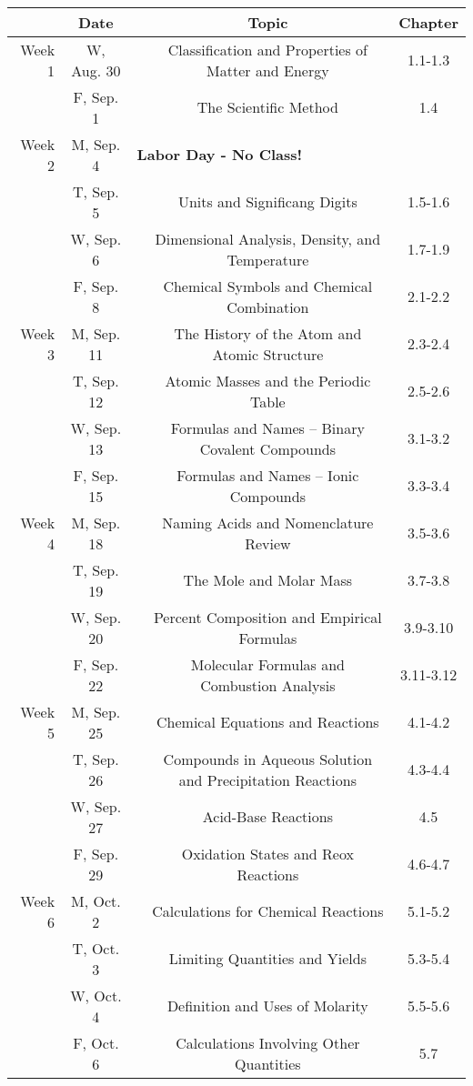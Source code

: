 \documentclass[12pt, letterpaper]{article}
\begin{document}
~

\noindent
\begin{tabular}{rcccc}
	& Date && Topic & Chapter\\
	\midrule
	Week 1 & W, Aug. 30&& Classification and Properties of Matter and Energy & 1.1-1.3\\
	& F, Sep. 1&& The Scientific Method & 1.4\\
	\midrule
	Week 2 & M, Sep. 4& \multicolumn{3}{l}{\textbf{Labor Day - No Class!}}\\
	& T, Sep. 5&& Units and Significang Digits & 1.5-1.6\\
	& W, Sep. 6&& Dimensional Analysis, Density, and Temperature & 1.7-1.9\\
	& F, Sep. 8&& Chemical Symbols and Chemical Combination & 2.1-2.2\\
	\midrule
	Week 3 & M, Sep. 11&& The History of the Atom and Atomic Structure & 2.3-2.4\\
	& T, Sep. 12&& Atomic Masses and the Periodic Table & 2.5-2.6\\
	& W, Sep. 13&& Formulas and Names -- Binary Covalent Compounds & 3.1-3.2\\
	& F, Sep. 15&& Formulas and Names -- Ionic Compounds & 3.3-3.4\\
	\midrule
	Week 4 & M, Sep. 18&& Naming Acids and Nomenclature Review & 3.5-3.6\\
	& T, Sep. 19&& The Mole and Molar Mass & 3.7-3.8\\
	& W, Sep. 20&& Percent Composition and Empirical Formulas & 3.9-3.10\\
	& F, Sep. 22&& Molecular Formulas and Combustion Analysis & 3.11-3.12\\
	\midrule
	Week 5 & M, Sep. 25&& Chemical Equations and Reactions & 4.1-4.2\\
	& T, Sep. 26&& Compounds in Aqueous Solution and Precipitation Reactions & 4.3-4.4\\
	& W, Sep. 27&& Acid-Base Reactions & 4.5\\
	& F, Sep. 29&& Oxidation States and Reox Reactions & 4.6-4.7\\
	\midrule
	Week 6 & M, Oct. 2&& Calculations for Chemical Reactions & 5.1-5.2\\
	& T, Oct. 3&& Limiting Quantities and Yields & 5.3-5.4\\
	& W, Oct. 4&& Definition and Uses of Molarity & 5.5-5.6\\
	& F, Oct. 6&& Calculations Involving Other Quantities & 5.7\\
	\midrule

\end{tabular}
\end{document}
